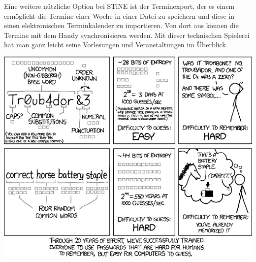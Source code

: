 Eine weitere nützliche Option bei STiNE ist der Terminexport, der es einem
ermöglicht die Termine einer Woche in einer Datei zu speichern und diese in
einen elektronischen Terminkalender zu importieren. Von dort aus können die
Termine mit dem Handy synchronisieren werden. Mit dieser technischen Spielerei
hat man ganz leicht seine Vorlesungen und Veranstaltungen im Überblick.

\begin{center}
\includegraphics[scale=0.5725]{comics/936}
\end{center}
